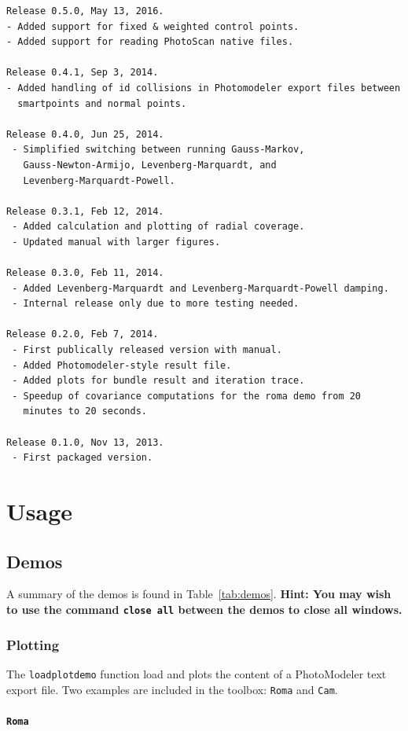 \documentclass{article}
\begin{document}
\begin{verbatim}
Release 0.5.0, May 13, 2016.
- Added support for fixed & weighted control points.
- Added support for reading PhotoScan native files.

Release 0.4.1, Sep 3, 2014.
- Added handling of id collisions in Photomodeler export files between 
  smartpoints and normal points.

Release 0.4.0, Jun 25, 2014.
 - Simplified switching between running Gauss-Markov,
   Gauss-Newton-Armijo, Levenberg-Marquardt, and
   Levenberg-Marquardt-Powell.

Release 0.3.1, Feb 12, 2014.
 - Added calculation and plotting of radial coverage.
 - Updated manual with larger figures.

Release 0.3.0, Feb 11, 2014.
 - Added Levenberg-Marquardt and Levenberg-Marquardt-Powell damping.
 - Internal release only due to more testing needed.

Release 0.2.0, Feb 7, 2014.
 - First publically released version with manual.
 - Added Photomodeler-style result file.
 - Added plots for bundle result and iteration trace.
 - Speedup of covariance computations for the roma demo from 20
   minutes to 20 seconds.

Release 0.1.0, Nov 13, 2013.
 - First packaged version.
\end{verbatim}

\newpage
\section{Usage}
\label{sec:org44b1ef6}
\subsection{Demos}
\label{sec:demos}
A summary of the demos is found in Table~\ref{tab:demos}.
\textbf{Hint: You may wish to use the command \texttt{close all} between the demos to close
all windows.}

\subsubsection{Plotting}
\label{sec:loadplotdemo}
The \texttt{loadplotdemo} function load and plots the content of a
PhotoModeler text export file. Two examples are included in the
toolbox: \texttt{Roma} and \texttt{Cam}.

\paragraph{\texttt{Roma}}
\label{sec:org7249333}
\end{document}
